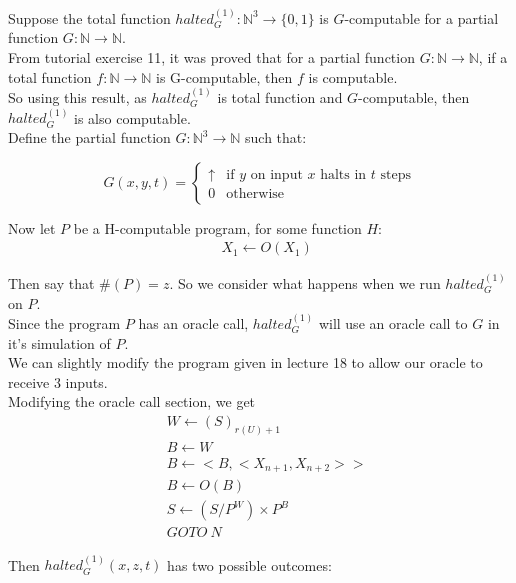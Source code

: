 \documentclass{assignment}
\begin{document}
\begin{problemlist}
\begin{answer}
    Suppose the total function $halted_{G}^{(1)}: \mathbb{N}^{3} \rightarrow \{ 0, 1\}$ is $G$-computable for a partial function $G:\mathbb{N}\rightarrow\mathbb{N}$.\\

    From tutorial exercise 11, it was proved that for a partial function $G:\mathbb{N}\rightarrow\mathbb{N}$, if a total function $f:\mathbb{N}\rightarrow\mathbb{N}$ is G-computable, then $f$ is computable.\\

    So using this result, as $halted_{G}^{(1)}$ is total function and $G$-computable, then $halted_{G}^{(1)}$ is also computable.\\
    
    Define the partial function $G:\mathbb{N}^3\rightarrow\mathbb{N}$ such that:
    
    \[
    G(x,y,t) =
    \begin{cases}
      \uparrow &\mbox{if } y \text{ on input } x \text{ halts in } t \text{ steps} \\
      0 & \mbox{otherwise }
    \end{cases}
    \]

    Now let $P$ be a H-computable program, for some function $H$:
    \begin{align*}
    [A]~&X_1\leftarrow O(X_1)
    \end{align*}

    Then say that $\#(P)=z$. So we consider what happens when we run $halted_G^{(1)}$ on $P$.\\
    Since the program $P$ has an oracle call, $halted_G^{(1)}$ will use an oracle call to $G$ in it's simulation of $P$.\\
    We can slightly modify the program given in lecture 18 to allow our oracle to receive 3 inputs.\\
    Modifying the oracle call section, we get
    \begin{align*}
      [O]~&W\leftarrow(S)_{r(U)+1}\\
      &B\leftarrow W\\
      &B \leftarrow <B,<X_{n+1},X_{n+2}>>\\
      &B\leftarrow O(B)\\
      &S\leftarrow (S/P^W)\times P^B\\
      &GOTO~N
    \end{align*}
    
    Then $halted_G^{(1)}(x,z,t)$ has two possible outcomes:\\


\end{answer}
\end{problemlist}
\end{document}

